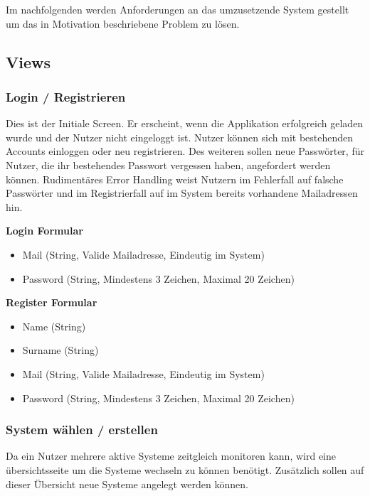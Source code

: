 Im nachfolgenden werden Anforderungen an das umzusetzende System gestellt um das in Motivation beschriebene Problem zu lösen.

\subsection{Views}
\subsubsection{Login / Registrieren}

Dies ist der Initiale Screen.
Er erscheint, wenn die Applikation erfolgreich geladen wurde und der Nutzer nicht eingeloggt ist.
Nutzer können sich mit bestehenden Accounts einloggen oder neu registrieren.
Des weiteren sollen neue Passwörter, für Nutzer, die ihr bestehendes Passwort vergessen haben, angefordert werden können.
Rudimentäres Error Handling weist Nutzern im Fehlerfall auf falsche Passwörter und im Registrierfall auf
im System bereits vorhandene Mailadressen hin.

\vspace{1cm}


\textbf{Login Formular}
\begin{itemize}
\item Mail (String, Valide Mailadresse, Eindeutig im System)
\item Password (String, Mindestens 3 Zeichen, Maximal 20 Zeichen)
\end{itemize}

\textbf{Register Formular}
\begin{itemize}
\item Name (String)
\item Surname (String)
\item Mail (String, Valide Mailadresse, Eindeutig im System)
\item Password (String, Mindestens 3 Zeichen, Maximal 20 Zeichen)
\end{itemize}


\vspace{1cm}

\subsubsection{System wählen / erstellen}

Da ein Nutzer mehrere aktive Systeme zeitgleich monitoren kann, wird eine übersichtsseite
um die Systeme wechseln zu können benötigt. Zusätzlich sollen auf dieser Übersicht
neue Systeme angelegt werden können.

